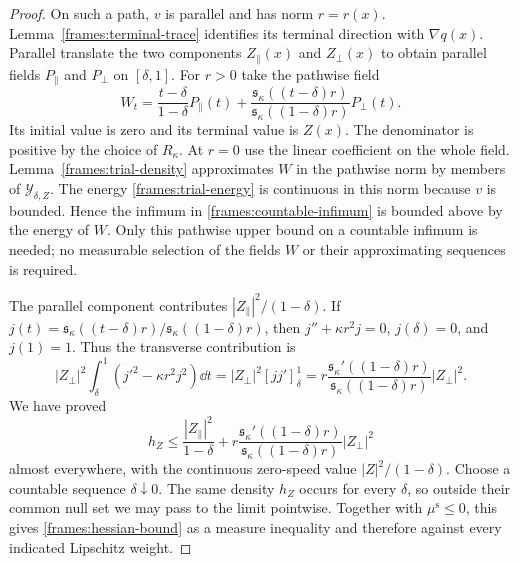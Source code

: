 \begin{proof}
 On such a path, $v$ is parallel and has norm $r=r(x)$.
 Lemma~\ref{frames:terminal-trace} identifies its terminal
 direction with $\nabla q(x)$.  Parallel translate the two
 components $Z_\parallel(x)$ and $Z_\perp(x)$ to obtain
 parallel fields $P_\parallel$ and $P_\perp$ on $[\delta,1]$.
 For $r>0$ take the pathwise field
 \[
  W_t=\frac{t-\delta}{1-\delta}P_\parallel(t)
       +\frac{\mathfrak s_\kappa((t-\delta)r)}
              {\mathfrak s_\kappa((1-\delta)r)}P_\perp(t).
 \]
 Its initial value is zero and its terminal value is $Z(x)$.
 The denominator is positive by the choice of $R_\kappa$.
 At $r=0$ use the linear coefficient on the whole field.
 Lemma~\ref{frames:trial-density} approximates $W$ in the
 pathwise norm by members of $\mathcal Y_{\delta,Z}$.
 The energy \eqref{frames:trial-energy} is continuous in this
 norm because $v$ is bounded.  Hence the infimum in
 \eqref{frames:countable-infimum} is bounded above by the
 energy of $W$.  Only this pathwise upper bound on a countable
 infimum is needed; no measurable selection of the fields
 $W$ or their approximating sequences is required.

 The parallel component contributes
 $|Z_\parallel|^2/(1-\delta)$.  If
 $j(t)=\mathfrak s_\kappa((t-\delta)r)/
             \mathfrak s_\kappa((1-\delta)r)$, then
 $j''+\kappa r^2j=0$, $j(\delta)=0$, and $j(1)=1$.
 Thus the transverse contribution is
 \[
  |Z_\perp|^2\int_\delta^1(j'^2-\kappa r^2j^2)\dd t
   =|Z_\perp|^2[jj']_\delta^1
   =r\frac{\mathfrak s_\kappa'((1-\delta)r)}
               {\mathfrak s_\kappa((1-\delta)r)}|Z_\perp|^2.
 \]
 We have proved
 \[
  h_Z\leq\frac{|Z_\parallel|^2}{1-\delta}
       +r\frac{\mathfrak s_\kappa'((1-\delta)r)}
                {\mathfrak s_\kappa((1-\delta)r)}|Z_\perp|^2
 \]
 almost everywhere, with the continuous zero-speed value
 $|Z|^2/(1-\delta)$.
 Choose a countable sequence $\delta\downarrow0$.
 The same density $h_Z$ occurs for every $\delta$, so outside
 their common null set we may pass to the limit pointwise.
 Together with $\mu^{\mathrm s}\leq0$, this gives
 \eqref{frames:hessian-bound} as a measure inequality and
 therefore against every indicated Lipschitz weight.
\end{proof}
